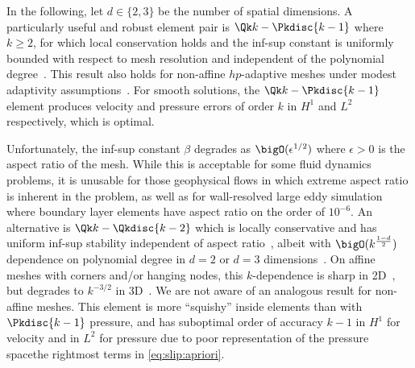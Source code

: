 In the following, let $d\in \{2,3\}$ be the number of spatial dimensions.
A particularly useful and robust element pair is $\Qk k-\Pkdisc{k-1}$ where $k \ge 2$, for which local conservation holds and the inf-sup constant is uniformly bounded with respect to mesh resolution and independent of the polynomial degree~\citep{bernardi1999uniform}.
This result also holds for non-affine $hp$-adaptive meshes under modest adaptivity assumptions~\citep{schieweck2008uniformly}.
For smooth solutions, the $\Qk k-\Pkdisc{k-1}$ element produces velocity and pressure errors of order $k$ in $H^1$ and $L^2$ respectively, which is optimal.

Unfortunately, the inf-sup constant $\beta$ degrades as $\bigO(\epsilon^{1/2})$ where $\epsilon > 0$ is the aspect ratio of the mesh.
While this is acceptable for some fluid dynamics problems, it is unusable for those geophysical flows in which extreme aspect ratio is inherent in the problem, as well as for wall-resolved large eddy simulation where boundary layer elements have aspect ratio on the order of $10^{-6}$.
An alternative is $\Qk k - \Qkdisc{k-2}$ which is locally conservative and has uniform inf-sup stability independent of aspect ratio~\citep{stenberg1996mixed,schotzau1998mhf}, albeit with $\bigO(k^\frac{1-d}{2})$ dependence on polynomial degree in $d=2$ or $d=3$ dimensions~\citep{maday1992pn}.
On affine meshes with corners and/or hanging nodes, this $k$-dependence is sharp in 2D~\citep{schotzau1999mhf}, but degrades to $k^{-3/2}$ in 3D~\citep{toselli2003mhf}.
We are not aware of an analogous result for non-affine meshes.
This element is more ``squishy'' inside elements than with $\Pkdisc{k-1}$ pressure, and has suboptimal order of accuracy $k-1$ in $H^1$ for velocity and in $L^2$ for pressure due to poor representation of the pressure spacethe rightmost terms in \eqref{eq:slip:apriori}.

